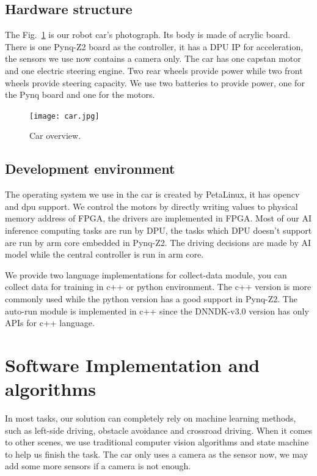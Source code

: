 \documentclass[conference]{IEEEtran}
\begin{document}
\subsection{Hardware structure}

The Fig.~\ref{co} is our robot car's photograph. Its body is made of acrylic board. There is one Pynq-Z2 board as the controller, it has a DPU IP for acceleration, the sensors we use now contains a camera only. The car has one capstan motor and one electric steering engine. Two rear wheels provide power while two front wheels provide steering capacity. We use two batteries to provide power, one for the Pynq board and one for the motors.

\begin{figure}[htbp]
\centerline{\texttt{[image: car.jpg]}}
\caption{Car overview.}
\label{co}
\end{figure}

\subsection{Development environment}

The operating system we use in the car is created by PetaLinux\cite{b11}, it has opencv and dpu support. We control the motors by directly writing values to physical memory address of FPGA, the drivers are implemented in FPGA. Most of our AI inference computing tasks are run by DPU, the tasks which DPU doesn't support are run by arm core embedded in Pynq-Z2. The driving decisions are made by AI model while the central controller is run in arm core.  

We provide two language implementations for collect-data module, you can collect data for training in c++ or python environment. The c++ version is more commonly used while the python version has a good support in Pynq-Z2. The auto-run module is implemented in c++ since the DNNDK-v3.0\cite{b12} version has only APIs for c++ language.

\section{Software Implementation and algorithms}

In most tasks, our solution can completely rely on machine learning methods, such as left-side driving, obstacle avoidance and crossroad driving. When it comes to other scenes, we use traditional computer vision algorithms and state machine to help us finish the task. The car only uses a camera as the sensor now, we may add some more sensors if a camera is not enough.
\end{document}
